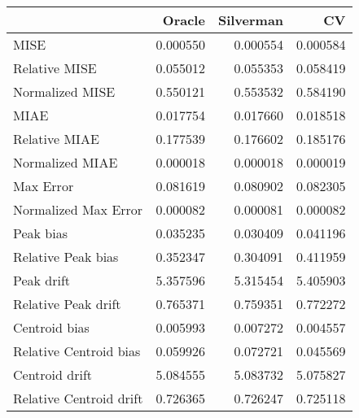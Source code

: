 \begin{tabular}{lrrr}
  \hline
 & Oracle & Silverman & CV \\ 
  \hline
MISE & 0.000550 & 0.000554 & 0.000584 \\ 
  Relative MISE & 0.055012 & 0.055353 & 0.058419 \\ 
  Normalized MISE & 0.550121 & 0.553532 & 0.584190 \\ 
  MIAE & 0.017754 & 0.017660 & 0.018518 \\ 
  Relative MIAE & 0.177539 & 0.176602 & 0.185176 \\ 
  Normalized MIAE & 0.000018 & 0.000018 & 0.000019 \\ 
  Max Error & 0.081619 & 0.080902 & 0.082305 \\ 
  Normalized Max Error & 0.000082 & 0.000081 & 0.000082 \\ 
  Peak bias & 0.035235 & 0.030409 & 0.041196 \\ 
  Relative Peak bias & 0.352347 & 0.304091 & 0.411959 \\ 
  Peak drift & 5.357596 & 5.315454 & 5.405903 \\ 
  Relative Peak drift & 0.765371 & 0.759351 & 0.772272 \\ 
  Centroid bias & 0.005993 & 0.007272 & 0.004557 \\ 
  Relative Centroid bias & 0.059926 & 0.072721 & 0.045569 \\ 
  Centroid drift & 5.084555 & 5.083732 & 5.075827 \\ 
  Relative Centroid drift & 0.726365 & 0.726247 & 0.725118 \\ 
   \hline
\end{tabular}
